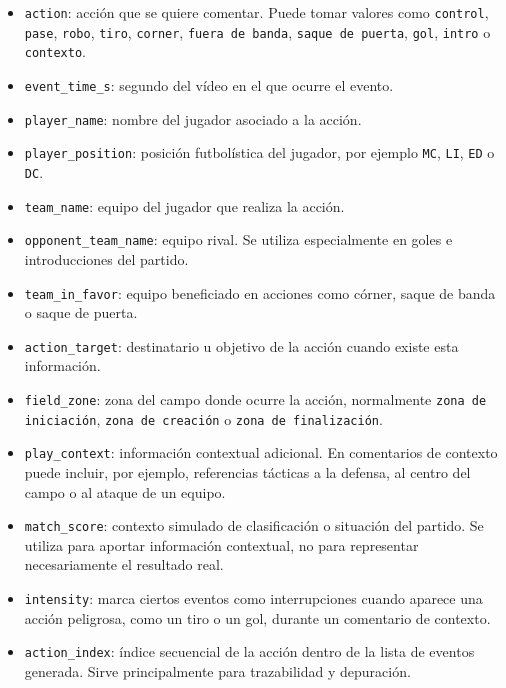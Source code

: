 \begin{itemize}
    \item \texttt{action}: acción que se quiere comentar. Puede tomar valores como \texttt{control}, \texttt{pase}, \texttt{robo}, \texttt{tiro}, \texttt{corner}, \texttt{fuera de banda}, \texttt{saque de puerta}, \texttt{gol}, \texttt{intro} o \texttt{contexto}.

    \item \texttt{event\_time\_s}: segundo del vídeo en el que ocurre el evento.

    \item \texttt{player\_name}: nombre del jugador asociado a la acción.

    \item \texttt{player\_position}: posición futbolística del jugador, por ejemplo \texttt{MC}, \texttt{LI}, \texttt{ED} o \texttt{DC}.

    \item \texttt{team\_name}: equipo del jugador que realiza la acción.

    \item \texttt{opponent\_team\_name}: equipo rival. Se utiliza especialmente en goles e introducciones del partido.

    \item \texttt{team\_in\_favor}: equipo beneficiado en acciones como córner, saque de banda o saque de puerta.

    \item \texttt{action\_target}: destinatario u objetivo de la acción cuando existe esta información.

    \item \texttt{field\_zone}: zona del campo donde ocurre la acción, normalmente \texttt{zona de iniciación}, \texttt{zona de creación} o \texttt{zona de finalización}.

    \item \texttt{play\_context}: información contextual adicional. En comentarios de contexto puede incluir, por ejemplo, referencias tácticas a la defensa, al centro del campo o al ataque de un equipo.

    \item \texttt{match\_score}: contexto simulado de clasificación o situación del partido. Se utiliza para aportar información contextual, no para representar necesariamente el resultado real.

    \item \texttt{intensity}: marca ciertos eventos como interrupciones cuando aparece una acción peligrosa, como un tiro o un gol, durante un comentario de contexto.

    \item \texttt{action\_index}: índice secuencial de la acción dentro de la lista de eventos generada. Sirve principalmente para trazabilidad y depuración.
\end{itemize}

